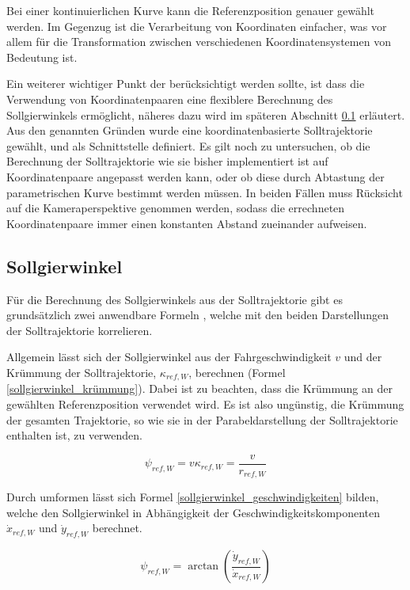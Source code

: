 Bei einer kontinuierlichen Kurve kann die Referenzposition genauer gewählt werden.
Im Gegenzug ist die Verarbeitung von Koordinaten einfacher, was vor allem für die Transformation zwischen verschiedenen Koordinatensystemen von Bedeutung ist.

Ein weiterer wichtiger Punkt der berücksichtigt werden sollte, ist dass die Verwendung von Koordinatenpaaren eine flexiblere Berechnung des Sollgierwinkels ermöglicht, näheres dazu wird im späteren Abschnitt \ref{controller-gierwinkel} erläutert.
\newline
Aus den genannten Gründen wurde eine koordinatenbasierte Solltrajektorie gewählt, und als Schnittstelle definiert.
Es gilt noch zu untersuchen, ob die Berechnung der Solltrajektorie wie sie bisher implementiert ist auf Koordinatenpaare angepasst werden kann, oder ob diese durch Abtastung der parametrischen Kurve bestimmt werden müssen.
In beiden Fällen muss Rücksicht auf die Kameraperspektive genommen werden, sodass die errechneten Koordinatenpaare immer einen konstanten Abstand zueinander aufweisen.


\subsection{Sollgierwinkel}
\label{controller-gierwinkel}
Für die Berechnung des Sollgierwinkels aus der Solltrajektorie gibt es grundsätzlich zwei anwendbare Formeln \cite{Nico_Stanley}, welche mit den beiden Darstellungen der Solltrajektorie korrelieren.

Allgemein lässt sich der Sollgierwinkel aus der Fahrgeschwindigkeit $v$ und der Krümmung der Solltrajektorie, $\kappa_{ref,W}$, berechnen (Formel \ref{sollgierwinkel_krümmung}).
Dabei ist zu beachten, dass die Krümmung an der gewählten Referenzposition verwendet wird. 
Es ist also ungünstig, die Krümmung der gesamten Trajektorie, so wie sie in der Parabeldarstellung der Solltrajektorie enthalten ist, zu verwenden.

\begin{equation}
\label{sollgierwinkel_krümmung}
\psi_{ref,W}=v\kappa_{ref,W}=\frac{v}{r_{ref,W}}
\end{equation}

Durch umformen lässt sich Formel \ref{sollgierwinkel_geschwindigkeiten} bilden, welche den Sollgierwinkel in Abhängigkeit der Geschwindigkeitskomponenten $\dot{x}_{ref,W}$ und $\dot{y}_{ref,W}$ berechnet.

\begin{equation}
\label{sollgierwinkel_geschwindigkeiten}
\psi_{ref,W}=\arctan \left( \frac{\dot{y}_{ref,W}}{\dot{x}_{ref,W}} \right)
\end{equation}


